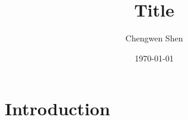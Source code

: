 \documentclass[12pt]{article}
\title{Title}
\author{Chengwen Shen}
\date{\today}
\begin{document}
\maketitle

\section{Introduction}
\end{document}
